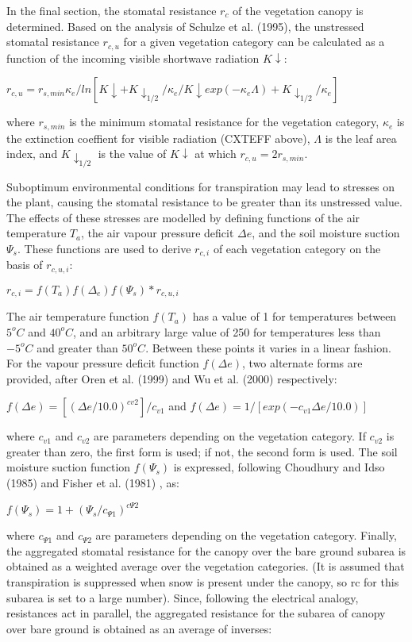 In the final section, the stomatal resistance $r_c$ of the vegetation canopy is determined. Based on the analysis of Schulze et al. (1995), the unstressed stomatal resistance $r_{c,u}$ for a given vegetation category can be calculated as a function of the incoming visible shortwave radiation $K\downarrow$\+:

$r_{c,u} = r_{s,min} \kappa_e / ln[{K\downarrow + K\downarrow_{1/2} / \kappa_e} / { K\downarrow exp(-\kappa_e \Lambda ) + K\downarrow_{1/2} / \kappa_e }]$

where $r_{s,min}$ is the minimum stomatal resistance for the vegetation category, $\kappa_e$ is the extinction coeffient for visible radiation (C\+X\+T\+E\+F\+F above), $\Lambda$ is the leaf area index, and $K\downarrow_{1/2}$ is the value of $K\downarrow$ at which $r_{c,u} = 2 r_{s,min}.$

Suboptimum environmental conditions for transpiration may lead to stresses on the plant, causing the stomatal resistance to be greater than its unstressed value. The effects of these stresses are modelled by defining functions of the air temperature $T_a$, the air vapour pressure deficit $\Delta e$, and the soil moisture suction $\Psi_s$. These functions are used to derive $r_{c,i}$ of each vegetation category on the basis of $r_{c,u,i}$\+:

$r_{c,i} = f(T_a) f( \Delta_e ) f( \Psi_s ) * r_{c,u,i}$

The air temperature function $f(T_a)$ has a value of 1 for temperatures between $5^o C$ and $40^o C$, and an arbitrary large value of 250 for temperatures less than $-5^o C$ and greater than $50^o C$. Between these points it varies in a linear fashion. For the vapour pressure deficit function $f( \Delta e )$, two alternate forms are provided, after Oren et al. (1999) and Wu et al. (2000) respectively\+:

$f( \Delta e) = [( \Delta e/10.0)^{cv2}]/c_{v1}$ and $f(\Delta e) = 1/[exp(-c_{v1} \Delta e/10.0)]$

where $c_{v1}$ and $c_{v2}$ are parameters depending on the vegetation category. If $c_{v2}$ is greater than zero, the first form is used; if not, the second form is used. The soil moisture suction function $f(\Psi_s)$ is expressed, following Choudhury and Idso (1985) \cite{Choudhury1985-mm} and Fisher et al. (1981) \cite{Fisher1981-xf} , as\+:

$f(\Psi_s) = 1 + (\Psi_s / c_{\Psi 1})^{c \Psi 2}$

where $c_{\Psi 1}$ and $c_{\Psi 2}$ are parameters depending on the vegetation category. Finally, the aggregated stomatal resistance for the canopy over the bare ground subarea is obtained as a weighted average over the vegetation categories. (It is assumed that transpiration is suppressed when snow is present under the canopy, so rc for this subarea is set to a large number). Since, following the electrical analogy, resistances act in parallel, the aggregated resistance for the subarea of canopy over bare ground is obtained as an average of inverses\+:

